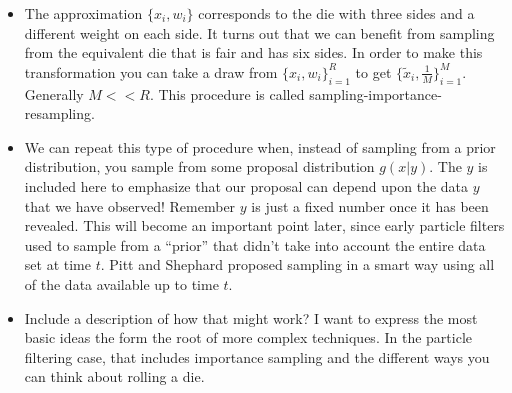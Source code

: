 \documentclass{article}
\begin{document}
\begin{itemize}
\begin{itemize}
\item The approximation $\{x_i, w_i\}$ corresponds to the die with three sides and a different weight on each side.  It turns out that we can benefit from sampling from the equivalent die that is fair and has six sides.  In order to make this transformation you can take a draw from $\{x_i, w_i\}_{i=1}^R$ to get $\{\tilde x_i, \frac{1}{M}\}_{i=1}^M$.  Generally $M << R$.  This procedure is called sampling-importance-resampling.
\item We can repeat this type of procedure when, instead of sampling from a prior distribution, you sample from some proposal distribution $g(x|y)$.  The $y$ is included here to emphasize that our proposal can depend upon the data $y$ that we have observed!  Remember $y$ is just a fixed number once it has been revealed.  This will become an important point later, since early particle filters used to sample from a ``prior'' that didn't take into account the entire data set at time $t$.  Pitt and Shephard proposed sampling in a smart way using all of the data available up to time $t$.
\item Include a description of how that might work?  I want to express the most basic ideas the form the root of more complex techniques.  In the particle filtering case, that includes importance sampling and the different ways you can think about rolling a die.

\end{itemize}

\end{itemize}
\end{document}
